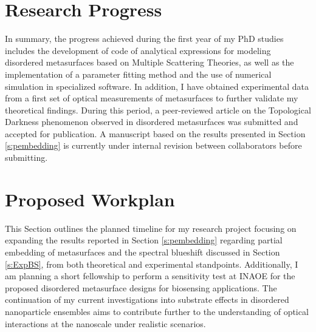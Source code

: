 
\section*{Research Progress}

In summary, the progress achieved during the first year of my PhD studies includes the development of code of analytical expressions for modeling disordered metasurfaces based on Multiple Scattering Theories, as well as the implementation of a parameter fitting method and the use of  numerical simulation in specialized software. In addition, I have obtained experimental data from a first set of optical measurements of metasurfaces to further validate my theoretical findings. During this period, a peer-reviewed article on the Topological Darkness phenomenon observed in disordered metasurfaces was submitted and accepted for  publication. A manuscript based on the results presented in Section \ref{s:pembedding} is currently under internal revision between collaborators before submitting. 


\section*{Proposed Workplan}

This Section outlines the planned timeline for my research project focusing on expanding the results reported in Section \ref{s:pembedding} regarding partial embedding of metasurfaces and the spectral blueshift discussed in Section \ref{s:ExpBS}, from both theoretical and experimental standpoints. Additionally, I am planning a short fellowship to perform a sensitivity test at INAOE for the proposed disordered metasurface designs for biosensing applications. The continuation of my current investigations into substrate effects in disordered nanoparticle ensembles aims to contribute further to the understanding of optical interactions at the nanoscale under realistic scenarios.

